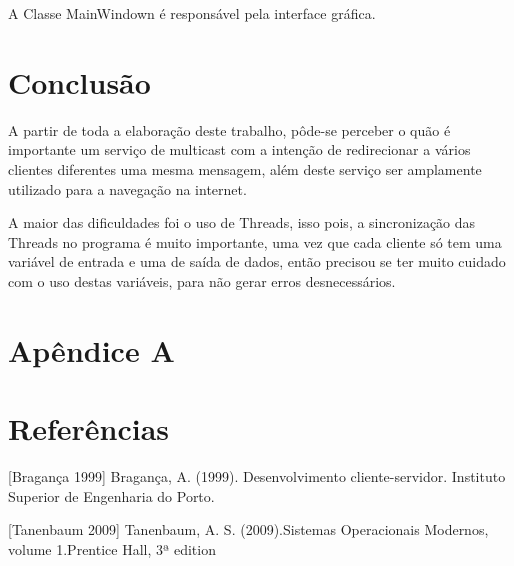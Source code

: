 \documentclass[brazil, a4paper,12pt]{article}
\begin{document}
A Classe MainWindown é responsável pela interface gráfica.

\section{Conclusão}

A partir de toda a elaboração deste trabalho, pôde-se perceber o quão é importante um serviço de multicast com a intenção de redirecionar a vários clientes diferentes uma mesma mensagem, além deste serviço ser amplamente utilizado para a navegação na internet.

A maior das dificuldades foi o uso de Threads, isso pois, a sincronização das Threads no programa é muito importante, uma vez que cada cliente só tem uma variável de entrada e uma de saída de dados, então precisou se ter muito cuidado com o uso destas variáveis, para não gerar erros desnecessários.



\section{Apêndice A}








\newpage
\section{Referências}
[Bragança 1999]  Bragança, A. (1999). Desenvolvimento cliente-servidor. Instituto Superior de Engenharia do Porto.

[Tanenbaum 2009]  Tanenbaum, A. S. (2009).Sistemas Operacionais Modernos, volume 1.Prentice Hall, 3ª edition
\end{document}
